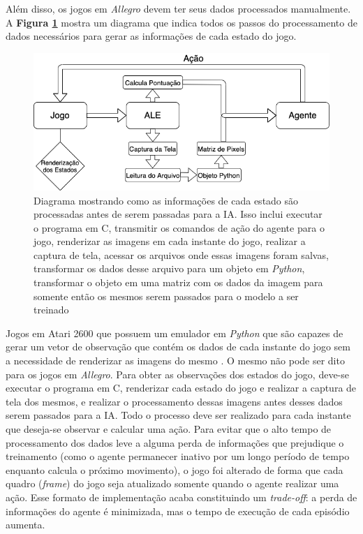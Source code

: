 Além disso, os jogos em \textit{Allegro} devem ter seus dados processados manualmente. A \textbf{Figura \ref{fig:process_img}} mostra um diagrama que indica todos os passos do processamento de dados necessários para gerar as informações de cada estado do jogo.

\begin{figure}[h]
  \centering
  \includegraphics[width=.8 \textwidth]{conteudo/imgs/processamento_imgs.png}
  \caption[Diagrama de processamento de imagens]{Diagrama mostrando como as informações de cada estado são processadas antes de serem passadas para a IA. Isso inclui executar o programa em C, transmitir os comandos de ação do agente para o jogo, renderizar as imagens em cada instante do jogo, realizar a captura de tela, acessar os arquivos onde essas imagens foram salvas, transformar os dados desse arquivo para um objeto em \textit{Python}, transformar o objeto em uma matriz com os dados da imagem para somente então os mesmos serem passados para o modelo a ser treinado}
  \label{fig:process_img}
\end{figure} 

Jogos em Atari 2600 que possuem um emulador em \textit{Python} que são capazes de gerar um vetor de observação que contém os dados de cada instante do jogo sem a necessidade de renderizar as imagens do mesmo \cite{brockman2016openai}. O mesmo não pode ser dito para os jogos em \textit{Allegro}. Para obter as observações dos estados do jogo, deve-se executar o programa em C, renderizar cada estado do jogo e realizar a captura de tela dos mesmos, e realizar o processamento dessas imagens antes desses dados serem passados para a IA. Todo o processo deve ser realizado para cada instante que deseja-se observar e calcular uma ação. Para evitar que o alto tempo de processamento dos dados leve a alguma perda de informações que prejudique o treinamento (como o agente permanecer inativo por um longo período de tempo enquanto calcula o próximo movimento), o jogo foi alterado de forma que cada quadro (\textit{frame}) do jogo seja atualizado somente quando o agente realizar uma ação. Esse formato de implementação acaba constituindo um \textit{trade-off}: a perda de informações do agente é minimizada, mas o tempo de execução de cada episódio aumenta.


